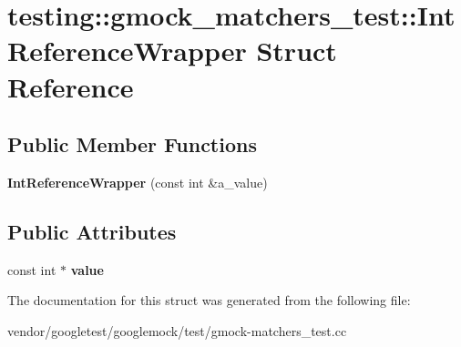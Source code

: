 \hypertarget{structtesting_1_1gmock__matchers__test_1_1_int_reference_wrapper}{}\section{testing\+:\+:gmock\+\_\+matchers\+\_\+test\+:\+:Int\+Reference\+Wrapper Struct Reference}
\label{structtesting_1_1gmock__matchers__test_1_1_int_reference_wrapper}
\subsection*{Public Member Functions}
\begin{DoxyCompactItemize}
\item 
\mbox{\label{structtesting_1_1gmock__matchers__test_1_1_int_reference_wrapper_a9094df655096520977e13d620fbf7be7}} 
{\bfseries Int\+Reference\+Wrapper} (const int \&a\+\_\+value)
\end{DoxyCompactItemize}
\subsection*{Public Attributes}
\begin{DoxyCompactItemize}
\item 
\mbox{\label{structtesting_1_1gmock__matchers__test_1_1_int_reference_wrapper_ac8fcb05733aa1fdb6c5236731b236cf6}} 
const int $\ast$ {\bfseries value}
\end{DoxyCompactItemize}


The documentation for this struct was generated from the following file\+:\begin{DoxyCompactItemize}
\item 
vendor/googletest/googlemock/test/gmock-\/matchers\+\_\+test.\+cc\end{DoxyCompactItemize}
